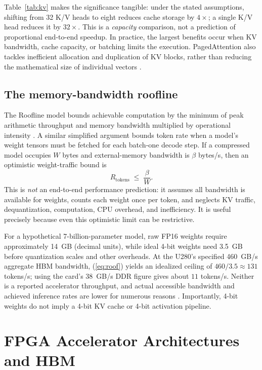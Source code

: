\documentclass[conference,10pt]{IEEEtran}
\begin{document}
Table~\ref{tab:kv} makes the significance tangible: under the stated assumptions, shifting from 32 K/V heads to eight reduces cache storage by $4\times$; a single K/V head reduces it by $32\times$. This is a \emph{capacity} comparison, not a prediction of proportional end-to-end speedup. In practice, the largest benefits occur when KV bandwidth, cache capacity, or batching limits the execution. PagedAttention also tackles inefficient allocation and duplication of KV blocks, rather than reducing the mathematical size of individual vectors \cite{kwon2023}.

\subsection{The memory-bandwidth roofline}
The Roofline model bounds achievable computation by the minimum of peak arithmetic throughput and memory bandwidth multiplied by operational intensity \cite{williams2009}. A similar simplified argument bounds token rate when a model's weight tensors must be fetched for each batch-one decode step. If a compressed model occupies $W$ bytes and external-memory bandwidth is $\beta$ bytes/s, then an optimistic weight-traffic bound is
\begin{equation}
R_{\mathrm{tokens}}\;\leq\;\frac{\beta}{W}. \label{eq:roof}
\end{equation}
This is \emph{not} an end-to-end performance prediction: it assumes all bandwidth is available for weights, counts each weight once per token, and neglects KV traffic, dequantization, computation, CPU overhead, and inefficiency. It is useful precisely because even this optimistic limit can be restrictive.

For a hypothetical 7-billion-parameter model, raw FP16 weights require approximately 14~GB (decimal units), while ideal 4-bit weights need 3.5~GB before quantization scales and other overheads. At the U280's specified 460~GB/s aggregate HBM bandwidth, (\ref{eq:roof}) yields an idealized ceiling of $460/3.5\approx131$ tokens/s; using the card's 38~GB/s DDR figure gives about $11$ tokens/s. Neither is a reported accelerator throughput, and actual accessible bandwidth and achieved inference rates are lower for numerous reasons \cite{amdU280}. Importantly, 4-bit weights do not imply a 4-bit KV cache or 4-bit activation pipeline.

\section{FPGA Accelerator Architectures and HBM}
\end{document}
